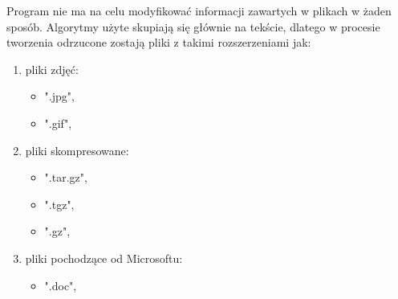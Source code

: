 Program nie ma na celu modyfikować informacji zawartych w plikach w żaden sposób.
Algorytmy użyte skupiają się głównie na tekście, dlatego w procesie tworzenia 
odrzucone zostają pliki z takimi rozszerzeniami jak:

\begin{enumerate}
  \item pliki zdjęć:
  \begin{itemize}
    \item ".jpg",  
    \item ".gif",
  \end{itemize}
  \item pliki skompresowane:
  \begin{itemize}
    \item ".tar.gz",
    \item ".tgz",
    \item ".gz",
  \end{itemize}
  \item pliki pochodzące od Microsoftu:
  \begin{itemize}
    \item ".doc", 
  \end{itemize}
\end{enumerate}


